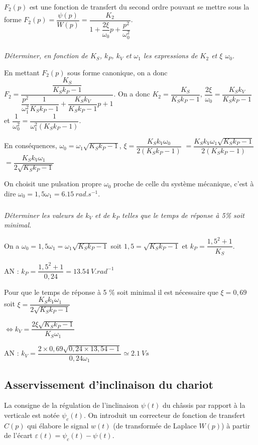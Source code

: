 \documentclass[10pt,fleqn]{article} %
\begin{document}
\ifprof
\else
$F_2(p)$ est une fonction de transfert du second ordre pouvant se mettre sous la forme 
$F_2(p)=\dfrac{\psi(p)}{W(p)}=\dfrac{K_2}{1+\dfrac{2\xi}{\omega_0}p+\dfrac{p^2}{\omega_0^2}}$.
\fi


\subparagraph{\label{q_26}}\textit{Déterminer, en fonction de $K_S$, $k_P$, $k_V$ et $\omega_1$ les expressions de $K_2$ et $\xi$ $\omega_0$.}
\ifprof
\begin{corrige}
En mettant $F_2(p)$ sous forme canonique, on a donc
$ F_2=\dfrac{\dfrac{K_S}{ K_Sk_P-1}}{\dfrac{p^2}{\omega_1^2}\dfrac{1}{ K_Sk_P-1}+\dfrac{K_Sk_V}{ K_Sk_P-1}p    +1} $.
On a donc $K_2 = \dfrac{K_S}{ K_Sk_P-1}$, $\dfrac{2\xi}{\omega_0} = \dfrac{K_Sk_V}{ K_Sk_P-1}$ et $\dfrac{1}{\omega_0^2} = \dfrac{1}{\omega_1^2\left( K_Sk_P-1\right)}$.

En conséquences, $\omega_0 = \omega_1\sqrt{K_Sk_P-1}$, 
$\xi = \dfrac{K_Sk_V \omega_0}{2 \left(K_Sk_P-1\right)}$
$=\dfrac{K_Sk_V \omega_1\sqrt{K_Sk_P-1}}{2 \left(K_Sk_P-1\right)}$
$=\dfrac{K_Sk_V \omega_1}{2\sqrt{K_Sk_P-1}}$
\end{corrige}
\else
\fi

On choisit une pulsation propre $\omega_0$  proche de celle du système mécanique, c’est à dire  
$\omega_0=1,5 \omega_1 = \SI{6,15}{rad.s^{-1}}$.

\subparagraph{\label{q_27}}\textit{Déterminer les valeurs de $k_V$ et de $k_P$ telles que le temps de réponse à 5\% soit minimal.}
\ifprof
\begin{corrige}
On a $\omega_0=1,5 \omega_1 =  \omega_1\sqrt{K_Sk_P-1}$ soit $1,5  = \sqrt{K_Sk_P-1}$ et $ k_P = \dfrac{1,5^2 +1}{K_S}$.

AN : $ k_P = \dfrac{1,5^2 +1}{0,24} = \SI{13,54}{V.rad^{-1}}$

Pour que le temps de réponse à 5 \% soit minimal il est nécessaire que $\xi=0,69$ soit $\xi=\dfrac{K_Sk_V \omega_1}{2\sqrt{K_Sk_P-1}}$

$\Leftrightarrow k_V = \dfrac{2\xi \sqrt{K_Sk_P-1}}{K_S \omega_1}  $

AN : $ k_V = \dfrac{2\times  0,69 \sqrt{0,24 \times 13,54-1}}{0,24 \omega_1} \simeq  \SI{2,1}{Vs}$

\end{corrige}
\else
\fi

\subsection{Asservissement d’inclinaison du chariot}

\ifprof
\else
La consigne de la régulation de l’inclinaison $\psi(t)$ du châssis par rapport à la verticale est notée $\psi_c(t)$. On introduit un correcteur de fonction de transfert $C(p)$ qui élabore le signal $w(t)$ (de transformée de Laplace $W(p)$) à partir de l’écart $\varepsilon(t)=\psi_c(t)-\psi(t)$.
\fi
\end{document}
